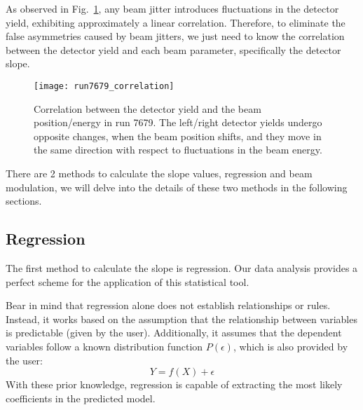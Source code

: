 As observed in Fig.~\ref{fig:correlation}, any beam jitter introduces
fluctuations in the detector yield, exhibiting approximately a linear correlation.
Therefore, to eliminate the false asymmetries caused by beam jitters, we just need to
know the correlation between the detector yield and each beam parameter, specifically
the detector slope. 

\begin{figure}[!h]
    \centering
    \texttt{[image: run7679\_correlation]}
    \caption[Correlation plot in run 7679]
    {Correlation between the detector yield and the beam position/energy in run 7679.
    The left/right detector yields undergo opposite changes, when the beam position shifts,
    and they move in the same direction with respect to fluctuations in the beam energy.
    }
    \label{fig:correlation}
\end{figure}

There are 2 methods to calculate the slope values, regression and beam modulation,
we will delve into the details of these two methods in the following sections.

\subsection{Regression}

The first method to calculate the slope is regression. Our data analysis 
provides a perfect scheme for the application of this statistical tool.

Bear in mind that regression alone does not establish relationships or rules.
Instead, it works based on the assumption that the relationship between variables 
is predictable (given by the user). Additionally, it assumes that the dependent 
variables follow a known distribution function $P(\epsilon)$, which is also provided by the user:
$$ Y = f(X) + \epsilon $$
With these prior knowledge, regression is capable of extracting the most likely 
coefficients in the predicted model.

